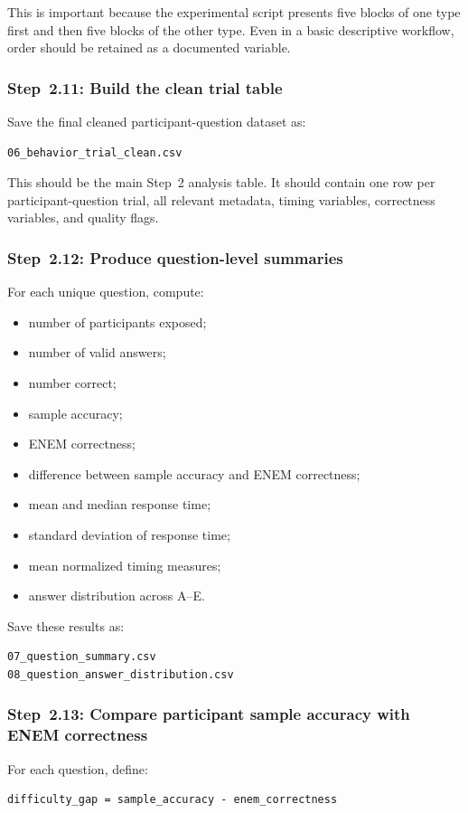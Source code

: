 \documentclass[11pt]{article}
\begin{document}
This is important because the experimental script presents five blocks of one type first and then five blocks of the other type.
Even in a basic descriptive workflow, order should be retained as a documented variable.

\subsubsection{Step~2.11: Build the clean trial table}
Save the final cleaned participant-question dataset as:
\begin{verbatim}
06_behavior_trial_clean.csv
\end{verbatim}

This should be the main Step~2 analysis table.
It should contain one row per participant-question trial, all relevant metadata, timing variables, correctness variables, and quality flags.

\subsubsection{Step~2.12: Produce question-level summaries}
For each unique question, compute:
\begin{itemize}
    \item number of participants exposed;
    \item number of valid answers;
    \item number correct;
    \item sample accuracy;
    \item ENEM correctness;
    \item difference between sample accuracy and ENEM correctness;
    \item mean and median response time;
    \item standard deviation of response time;
    \item mean normalized timing measures;
    \item answer distribution across A--E.
\end{itemize}

Save these results as:
\begin{verbatim}
07_question_summary.csv
08_question_answer_distribution.csv
\end{verbatim}

\subsubsection{Step~2.13: Compare participant sample accuracy with ENEM correctness}
For each question, define:
\begin{verbatim}
difficulty_gap = sample_accuracy - enem_correctness
\end{verbatim}
\end{document}
